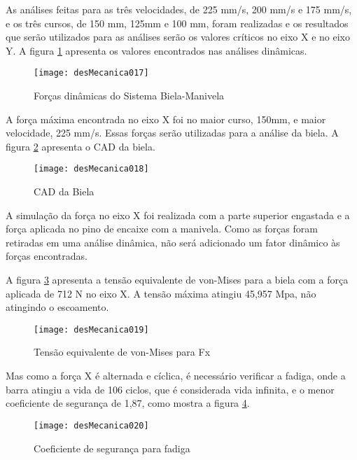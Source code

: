 		As análises feitas para as três velocidades, de 225 mm/s, 200 mm/s e 175 mm/s, e os três cursos, de 150 mm, 125mm e 100 mm, foram realizadas e os resultados que serão utilizados para as análises serão os valores críticos no eixo X e no eixo Y. A figura \ref{desMecanica017} apresenta os valores encontrados nas análises dinâmicas.

		\begin{figure}[!h]
			\centering
			\texttt{[image: desMecanica017]}
			\caption{Forças dinâmicas do Sistema Biela-Manivela}
			\label{desMecanica017}
		\end{figure}

		A força máxima encontrada no eixo X foi no maior curso, 150mm, e maior velocidade, 225 mm/s. Essas forças serão utilizadas para a análise da biela. A figura \ref{desMecanica018} apresenta o CAD da biela.

		\newpage
		\begin{figure}[!h]
			\centering
			\texttt{[image: desMecanica018]}
			\caption{CAD da Biela}
			\label{desMecanica018}
		\end{figure}

		A simulação da força no eixo X foi realizada com a parte superior engastada e a força aplicada no pino de encaixe com a manivela. Como as forças foram retiradas em uma análise dinâmica, não será adicionado um fator dinâmico às forças encontradas.
		
		A figura \ref{desMecanica019} apresenta a tensão equivalente de von-Mises para a biela com a força aplicada de 712 N no eixo X. A tensão máxima atingiu 45,957 Mpa, não atingindo o escoamento.

		\newpage
		\begin{figure}[!h]
			\centering
			\texttt{[image: desMecanica019]}
			\caption{Tensão equivalente de von-Mises para Fx}
			\label{desMecanica019}
		\end{figure}

		Mas como a força X é alternada e cíclica, é necessário verificar a fadiga, onde a barra atingiu a vida de 106 ciclos, que é considerada vida infinita, e o menor coeficiente de segurança de 1,87, como mostra a figura \ref{desMecanica020}. 

		\newpage
		\begin{figure}[!h]
			\centering
			\texttt{[image: desMecanica020]}
			\caption{Coeficiente de segurança para fadiga}
			\label{desMecanica020}
		\end{figure}

